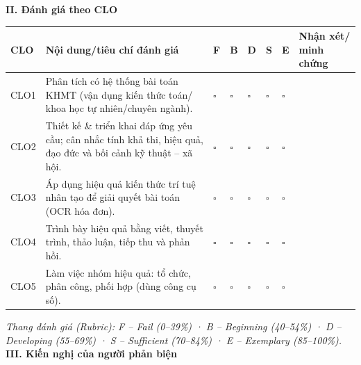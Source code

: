 \textbf{II. Đánh giá theo CLO}

\begin{landscape}\begin{center}{\footnotesize\singlespacing\renewcommand{\arraystretch}{1.25}
\begin{tabular}{|>{\raggedright\arraybackslash}p{}|>{\raggedright\arraybackslash}p{}|>{\raggedright\arraybackslash}p{}|>{\raggedright\arraybackslash}p{}|>{\raggedright\arraybackslash}p{}|>{\raggedright\arraybackslash}p{}|>{\raggedright\arraybackslash}p{}|>{\raggedright\arraybackslash}p{}|}
\hline
\textbf{CLO} & \textbf{Nội dung/​tiêu chí đánh giá} & \textbf{F} & \textbf{B} & \textbf{D} & \textbf{S} & \textbf{E} & \textbf{Nhận xét/​minh chứng} \\ \hline
CLO1 & Phân tích có hệ thống bài toán KHMT (vận dụng kiến thức toán/​khoa học tự nhiên/​chuyên ngành). & $\square$ & $\square$ & $\square$ & $\square$ & $\square$ &  \\ \hline
CLO2 & Thiết kế \& triển khai đáp ứng yêu cầu; cân nhắc tính khả thi, hiệu quả, đạo đức và bối cảnh kỹ thuật – xã hội. & $\square$ & $\square$ & $\square$ & $\square$ & $\square$ &  \\ \hline
CLO3 & Áp dụng hiệu quả kiến thức trí tuệ nhân tạo để giải quyết bài toán (OCR hóa đơn). & $\square$ & $\square$ & $\square$ & $\square$ & $\square$ &  \\ \hline
CLO4 & Trình bày hiệu quả bằng viết, thuyết trình, thảo luận, tiếp thu và phản hồi. & $\square$ & $\square$ & $\square$ & $\square$ & $\square$ &  \\ \hline
CLO5 & Làm việc nhóm hiệu quả: tổ chức, phân công, phối hợp (dùng công cụ số). & $\square$ & $\square$ & $\square$ & $\square$ & $\square$ &  \\ \hline
\end{tabular}}\end{center}\end{landscape}
\textit{Thang đánh giá (Rubric): F – Fail (0–39\%) · B – Beginning (40–54\%) · D – Developing (55–69\%) · S – Sufficient (70–84\%) · E – Exemplary (85–100\%).}
\textbf{III. Kiến nghị của người phản biện}

